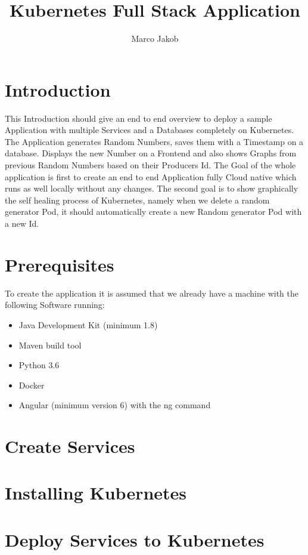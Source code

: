\documentclass{article}
\author{Marco Jakob}
\title{Kubernetes Full Stack Application}
\begin{document}
\maketitle
\newpage
\tableofcontents
\newpage

\section{Introduction}
This Introduction should give an end to end overview to deploy a sample Application with multiple Services and a Databases completely on Kubernetes.
The Application generates Random Numbers, saves them with a Timestamp on a database. Displays the new Number on a Frontend and also shows Graphs from previous Random Numbers based on their Producers Id.
The Goal of the whole application is first to create an end to end Application fully Cloud native which runs as well locally without any changes. The second goal is to show graphically the self healing process of Kubernetes, namely when we delete a random generator Pod, it should automatically create a new Random generator Pod with a new Id.
\section{Prerequisites}
To create the application it is assumed that we already have a machine with the following Software running:
\begin{itemize}
\item Java Development Kit (minimum 1.8)
\item Maven build tool
\item Python 3.6
\item Docker
\item Angular (minimum version 6) with the ng command
\end{itemize}



\section{Create Services}

\section{Installing Kubernetes}
\section{Deploy Services to Kubernetes}
\end{document}
